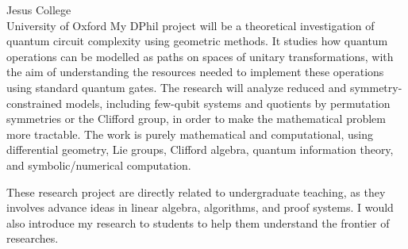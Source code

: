 \documentclass{letter}
\begin{document}
\begin{letter}{Jesus College \\ University of Oxford}
My DPhil project will be a theoretical investigation of quantum circuit complexity using geometric methods. It studies how quantum operations can be modelled as paths on spaces of unitary transformations, with the aim of understanding the resources needed to implement these operations using standard
quantum gates. 
The research will analyze reduced and symmetry-constrained models, including few-qubit systems and quotients by permutation symmetries or the Clifford group, in order to make the mathematical problem more tractable. 
The work is purely mathematical and computational, using differential geometry, Lie groups, Clifford algebra, quantum information theory, and
symbolic/numerical computation. 

These research project are directly related to undergraduate teaching, as they involves advance ideas in linear algebra, algorithms, and proof systems. 
I would also introduce my research to students to help them understand the frontier of researches.

\end{letter}
\end{document}

